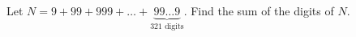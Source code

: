Let $N=9+99+999+\ldots+ \underbrace{99\ldots9}_{321\text{ digits}}$. Find the sum of the digits of $N$.
